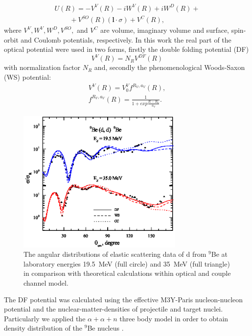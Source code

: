 \documentclass[10pt]{iopart}
\begin{document}
\begin{equation}\label{eqn:OP}
\begin{array}{l}
 U(R)=-V^{V}(R)-iW^{V}(R)+iW^D(R)+\\
~~~ ~~~~~~~+V^{SO}(R)( \mathbf{l} \cdot \sigma )+V^C(R),
\end{array}
\end{equation}
where $V^{V}, W^{V}, W^D, V^{SO},$ and $V^C$ are volume, imaginary volume and surface, spin-orbit and Coulomb potentials, respectively. In this work the real part of the optical potential were used in two forms, firstly the double folding potential (DF)
\begin{equation}
V^V(R) = N_R V^{DF}(R)
\end{equation}
with normalization factor $N_R$ and, secondly the phenomenological Woods-Saxon (WS) potential:
\begin{eqnarray}
V^V(R) =  V^V_0 f^{R_V, a_V}(R), \\
 f^{R_V,a_V}(R)=\frac{1}{1+exp{\frac{R-R_V}{a_V}}}.
\end{eqnarray}

\begin{figure}[tp]
\centering
\includegraphics[width=8.2cm]{2H9BE.eps}
\caption{ \label{2H9BE}  \footnotesize The angular distributions of elastic scattering data of d from $^9$Be at laboratory energies 19.5~MeV (full circle) and 35~MeV (full triangle) in comparison with theoretical calculations within optical and couple channel model.}
\end{figure}


The DF potential was calculated using the effective M3Y-Paris nucleon-nucleon potential and the nuclear-matter-densities of projectile and target nuclei. Particularly we applied the $\alpha+\alpha+n$ three body model in order to obtain density distribution of the $^9$Be nucleus \cite{urazbekov2016}.
\end{document}
